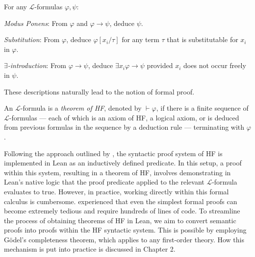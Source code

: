 \begin{definition}
    \label{def:Prf.mp+Prf.subst+Prf.exists_intro}
    \leanok
    For any $\mathcal{L}$-formulas $\varphi, \psi$:
    \begin{description}
        \item \textit{Modus Ponens}: 
        From $\varphi$ and $\varphi \rightarrow \psi$, deduce $\psi$.
        \item \textit{Substitution}:
        From $\varphi$, deduce $\varphi[x_i/\tau]$ for any term $\tau$ that is substitutable for
        $x_i$ in $\varphi$.
        \item \textit{$\exists$-introduction}:
        From $\varphi \rightarrow \psi$, deduce $\exists x_i \varphi \rightarrow \psi$ provided
        $x_i$ does not occur freely in $\psi$.
    \end{description}
\end{definition}

These descriptions naturally lead to the notion of formal proof.

\begin{definition}[Theorem of HF]
    \label{def:Prf}
    \leanok
    An $\mathcal{L}$-formula is a \textit{theorem of HF}, denoted by $\vdash \varphi$, 
    if there is a finite sequence of $\mathcal{L}$-formulas — each of which is an axiom of HF, 
    a logical axiom, or is deduced from previous formulas in the sequence by a deduction rule —
    terminating with $\varphi$.
\end{definition}

Following the approach outlined by \cite{paulson2014machine}, 
the syntactic proof system of HF is implemented in Lean as an inductively defined predicate. 
In this setup, a proof within this system, resulting in a theorem of HF, 
involves demonstrating in Lean’s native logic that 
the proof predicate applied to the relevant $\mathcal{L}$-formula evaluates to true.
However, in practice, working directly within this formal calculus is cumbersome. 
\cite{paulson2014machine} experienced that even the simplest formal proofs can become extremely 
tedious and require hundreds of lines of code.
To streamline the process of obtaining theorems of HF in Lean, 
we aim to convert semantic proofs into proofs within the HF syntactic system. 
This is possible by employing Gödel's completeness theorem, which applies to any first-order theory.
How this mechanism is put into practice is discussed in Chapter 2.


